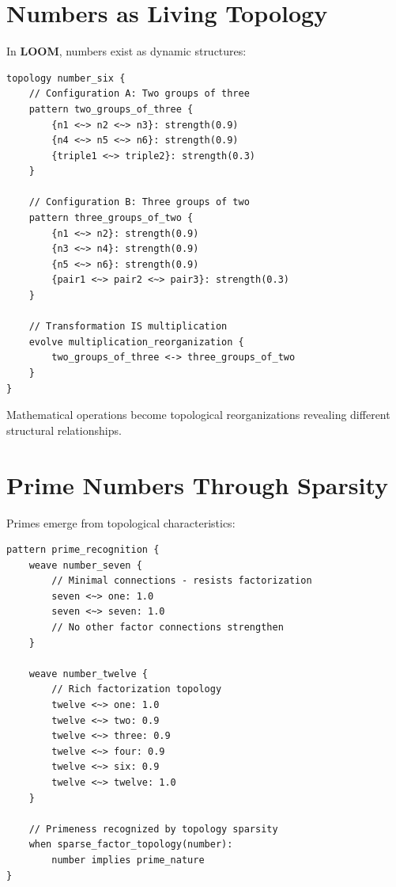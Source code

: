 \documentclass[12pt,a4paper,openany]{book} %
\newcommand{\loom}{\textbf{LOOM}}
\begin{document}
\section{Numbers as Living Topology}

In \loom{}, numbers exist as dynamic structures:

\vspace{0.5em}
\begin{lstlisting}[language=loom]
topology number_six {
    // Configuration A: Two groups of three
    pattern two_groups_of_three {
        {n1 <~> n2 <~> n3}: strength(0.9)
        {n4 <~> n5 <~> n6}: strength(0.9)
        {triple1 <~> triple2}: strength(0.3)
    }

    // Configuration B: Three groups of two
    pattern three_groups_of_two {
        {n1 <~> n2}: strength(0.9)
        {n3 <~> n4}: strength(0.9)
        {n5 <~> n6}: strength(0.9)
        {pair1 <~> pair2 <~> pair3}: strength(0.3)
    }

    // Transformation IS multiplication
    evolve multiplication_reorganization {
        two_groups_of_three <-> three_groups_of_two
    }
}
\end{lstlisting}
\vspace{0.5em}

Mathematical operations become topological reorganizations revealing different structural relationships.

\section{Prime Numbers Through Sparsity}

Primes emerge from topological characteristics:

\vspace{0.5em}
\begin{lstlisting}[language=loom]
pattern prime_recognition {
    weave number_seven {
        // Minimal connections - resists factorization
        seven <~> one: 1.0
        seven <~> seven: 1.0
        // No other factor connections strengthen
    }

    weave number_twelve {
        // Rich factorization topology
        twelve <~> one: 1.0
        twelve <~> two: 0.9
        twelve <~> three: 0.9
        twelve <~> four: 0.9
        twelve <~> six: 0.9
        twelve <~> twelve: 1.0
    }

    // Primeness recognized by topology sparsity
    when sparse_factor_topology(number):
        number implies prime_nature
}
\end{lstlisting}
\vspace{0.5em}
\end{document}
